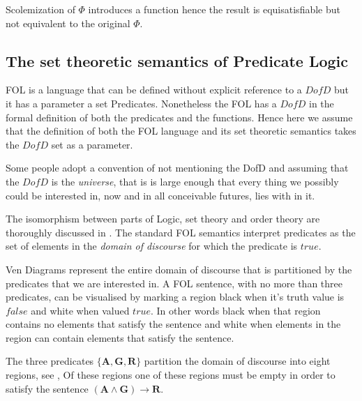 Scolemization of $\Phi$ introduces a function hence the result is equisatisfiable  but not equivalent to the original $\Phi$.



\subsection{The set theoretic semantics of Predicate Logic} \label{sec:SetSem}
FOL is a language that can be defined without explicit reference to a  $DofD$ but it has a parameter a set Predicates. Nonetheless the FOL has a  $DofD$  in the formal definition of both the predicates and the functions.  Hence here we assume that the definition of both the FOL language and its set theoretic semantics takes the $DofD$ set as a parameter.

Some people adopt a convention of not mentioning the DofD and assuming that the $DofD$ is the \emph{universe}, that is is large enough that every thing we possibly could be interested in, now and in all conceivable futures, lies with in it. 


The isomorphism between parts of Logic, set theory and order theory are thoroughly discussed in \cite{SVic91}. The standard FOL semantics interpret predicates as the set of elements in the \emph{domain of discourse} for which the predicate is $true$. 

Ven Diagrams represent the entire domain of discourse that is partitioned by the predicates that we are interested in. A FOL sentence, with no more than three predicates,  can be visualised by marking a region black when it's truth value is $false$ and white when valued $true$. In other words black when that region contains no elements that satisfy the sentence and white when  elements in the region can contain elements that satisfy the sentence.
 

The three predicates $\mathbf{\{A, G, R\}}$ partition the domain of discourse into  eight regions, see ,  Of these regions one of these regions must be empty  in order to satisfy the sentence $\mathbf{(A\wedge G)   \rightarrow R}$.

